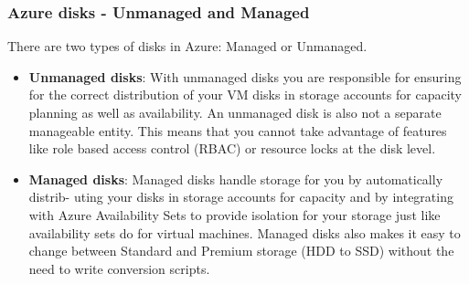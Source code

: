 \documentclass[12pt]{article}
\begin{document}
\subsubsection{Azure disks - Unmanaged and Managed}
There are two types of disks in Azure: Managed or Unmanaged.
\begin{itemize}
    \item \textbf{Unmanaged disks}: With unmanaged disks you are responsible for ensuring for the correct distribution of your VM disks in storage accounts for capacity planning as well as availability. An unmanaged disk is also not a separate manageable entity. This means that you cannot take advantage of features like role based access control (RBAC) or resource locks at the disk level.
    \item \textbf{Managed disks}: Managed disks handle storage for you by automatically distrib- uting your disks in storage accounts for capacity and by integrating with Azure Availability Sets to provide isolation for your storage just like availability sets do for virtual machines. Managed disks also makes it easy to change between Standard and Premium storage (HDD to SSD) without the need to write conversion scripts.
\end{itemize}
\end{document}
